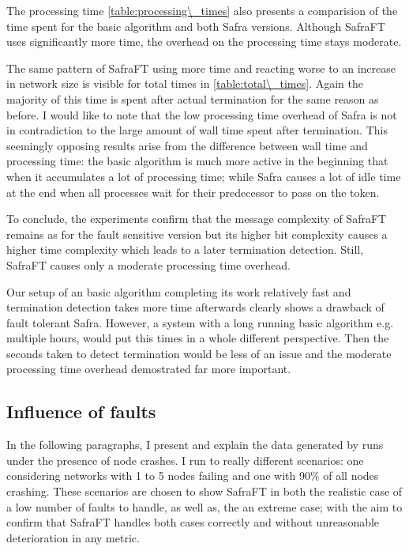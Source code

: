The processing time \cref{table:processing\_times} also presents a comparision of the time spent for the basic algorithm and both Safra versions.
Although SafraFT uses significantly more time, the overhead on the processing time stays moderate.

The same pattern of SafraFT using more time and reacting worse to an increase in network size is visible for total times in \cref{table:total\_times}.
Again the majority of this time is spent after actual termination for the same reason as before.
I would like to note that the low processing time overhead of Safra is not in contradiction to the large amount of wall time spent after termination.
This seemingly opposing results arise from the difference between wall time and processing time: the basic algorithm is much more active in the beginning that when it accumulates a lot of processing time; while Safra causes a lot of idle time at the end when all processes wait for their predecessor to pass on the token.

To conclude, the experiments confirm that the message complexity of SafraFT remains as for the fault sensitive version but its higher bit complexity causes a higher time complexity which leads to a later termination detection. 
Still, SafraFT causes only a moderate processing time overhead.

Our setup of an basic algorithm completing its work relatively fast and termination detection takes more time afterwards clearly shows a drawback of fault tolerant Safra.
However, a system with a long running basic algorithm e.g. multiple hours, would put this times in a whole different perspective.
Then the seconds taken to detect termination would be less of an issue and the moderate processing time overhead demostrated far more important.

\subsection{Influence of faults}
In the following paragraphs, I present and explain the data generated by runs under the presence of node crashes.
I run to really different scenarios: one considering networks with 1 to 5 nodes failing and one with 90\% of all nodes crashing.
These scenarios are chosen to show SafraFT in both the realistic case of a low number of faults to handle, as well as, the an extreme case; with the aim to confirm that SafraFT handles both cases correctly and
without unreasonable deterioration in any metric.

